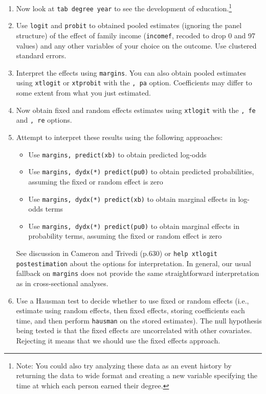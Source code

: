 \documentclass[a4paper,12pt]{article}
\begin{document}
\begin{enumerate}
\item Now look at \texttt{tab degree year} to see the development of education.\footnote{Note: You could also try analyzing these data as an event history by returning the data to wide format and creating a new variable specifying the time at which each person earned their degree.}

\item Use \texttt{logit} and \texttt{probit} to obtained pooled estimates (ignoring the panel structure) of the effect of family income (\texttt{incomef}, recoded to drop 0 and 97 values) and any other variables of your choice on the outcome. Use clustered standard errors.

\item Interpret the effects using \texttt{margins}. You can also obtain pooled estimates using \texttt{xtlogit} or \texttt{xtprobit} with the \texttt{, pa} option. Coefficients may differ to some extent from what you just estimated.

\item Now obtain fixed and random effects estimates using \texttt{xtlogit} with the \texttt{, fe} and \texttt{, re} options.

\item Attempt to interpret these results using the following approaches:

    \begin{itemize}
    \item Use \texttt{margins, predict(xb)} to obtain predicted log-odds
    \item Use \texttt{margins, dydx(*) predict(pu0)} to obtain predicted probabilities, assuming the fixed or random effect is zero
    \item Use \texttt{margins, dydx(*) predict(xb)} to obtain marginal effects in log-odds terms
    \item Use \texttt{margins, dydx(*) predict(pu0)} to obtain marginal effects in probability terms, assuming the fixed or random effect is zero
    \end{itemize}

See discussion in Cameron and Trivedi (p.630) or \texttt{help xtlogit postestimation} about the options for interpretation. In general, our usual fallback on \texttt{margins} does not provide the same straightforward interpretation as in cross-sectional analyses.

\item Use a Hausman test to decide whether to use fixed or random effects (i.e., estimate using random effects, then fixed effects, storing coefficients each time, and then perform \texttt{hausman} on the stored estimates). The null hypothesis being tested is that the fixed effects are uncorrelated with other covariates. Rejecting it means that we should use the fixed effects approach.


\end{enumerate}
\end{document}
